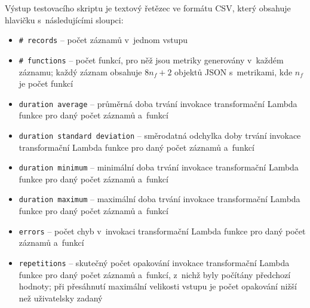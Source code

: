 \documentclass[czech, ing, kiv, he, iso690]{fasthesis}
\begin{document}
Výstup testovacího skriptu je textový řetězec ve formátu CSV, který obsahuje hlavičku s~následujícími sloupci:

\begin{itemize}
    \item \verb|# records| -- počet záznamů v~jednom vstupu
    \item \verb|# functions| -- počet funkcí, pro něž jsou metriky generovány v~každém záznamu; každý záznam obsahuje $8n_f+2$ objektů JSON s~metrikami, kde $n_f$ je počet funkcí
    \item \verb|duration average| -- průměrná doba trvání invokace transformační Lambda funkce pro daný počet záznamů a~funkcí
    \item \verb|duration standard deviation| -- směrodatná odchylka doby trvání invokace transformační Lambda funkce pro daný počet záznamů a~funkcí
    \item \verb|duration minimum| -- minimální doba trvání invokace transformační Lambda funkce pro daný počet záznamů a~funkcí
    \item \verb|duration maximum| -- maximální doba trvání invokace transformační Lambda funkce pro daný počet záznamů a~funkcí
    \item \verb|errors| -- počet chyb v~invokaci transformační Lambda funkce pro daný počet záznamů a~funkcí
    \item \verb|repetitions| -- skutečný počet opakování invokace transformační Lambda funkce pro daný počet záznamů a~funkcí, z~nichž byly počítány předchozí hodnoty; při přesáhnutí maximální velikosti vstupu je počet opakování nižší než uživatelsky zadaný
\end{itemize}


\end{document}
